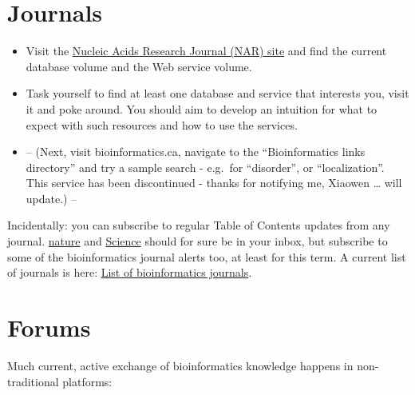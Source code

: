 \documentclass[]{book}
\providecommand{\tightlist}{%
  \setlength{\itemsep}{0pt}\setlength{\parskip}{0pt}}
\begin{document}
\section{Journals}\label{journals}

\begin{rmd-task}
\begin{itemize}
\tightlist
\item
  Visit the \href{https://academic.oup.com/nar}{Nucleic Acids Research
  Journal (NAR) site} and find the current database volume and the Web
  service volume.
\item
  Task yourself to find at least one database and service that interests
  you, visit it and poke around. You should aim to develop an intuition
  for what to expect with such resources and how to use the services.
\item
  -- (Next, visit bioinformatics.ca, navigate to the ``Bioinformatics
  links directory'' and try a sample search - e.g.~for ``disorder'', or
  ``localization''. This service has been discontinued - thanks for
  notifying me, Xiaowen \ldots{} will update.) --
\end{itemize}
\end{rmd-task}

Incidentally: you can subscribe to regular Table of Contents updates
from any journal. \href{https://www.nature.com/}{nature} and
\href{https://science.sciencemag.org/}{Science} should for sure be in
your inbox, but subscribe to some of the bioinformatics journal alerts
too, at least for this term. A current list of journals is here:
\href{https://en.wikipedia.org/wiki/List_of_bioinformatics_journals}{List
of bioinformatics journals}.

\section{Forums}\label{forums}

Much current, active exchange of bioinformatics knowledge happens in
non-traditional platforms:
\end{document}
